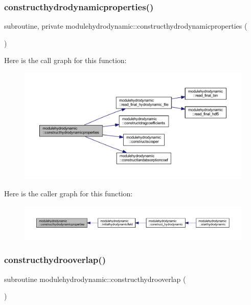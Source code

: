 \subsubsection{\texorpdfstring{constructhydrodynamicproperties()}{constructhydrodynamicproperties()}}
{\footnotesize\ttfamily subroutine, private modulehydrodynamic\+::constructhydrodynamicproperties (\begin{DoxyParamCaption}{ }\end{DoxyParamCaption})\hspace{0.3cm}{\ttfamily [private]}}

Here is the call graph for this function\+:\nopagebreak
\begin{figure}[H]
\begin{center}
\leavevmode
\includegraphics[width=350pt]{namespacemodulehydrodynamic_af871717e205963c29069ba0ee23cd512_cgraph}
\end{center}
\end{figure}
Here is the caller graph for this function\+:\nopagebreak
\begin{figure}[H]
\begin{center}
\leavevmode
\includegraphics[width=350pt]{namespacemodulehydrodynamic_af871717e205963c29069ba0ee23cd512_icgraph}
\end{center}
\end{figure}
\mbox{\label{namespacemodulehydrodynamic_a144fedbdcc486e7eda6dcae5d0b49d78}} 
\subsubsection{\texorpdfstring{constructhydrooverlap()}{constructhydrooverlap()}}
{\footnotesize\ttfamily subroutine modulehydrodynamic\+::constructhydrooverlap (\begin{DoxyParamCaption}{ }\end{DoxyParamCaption})\hspace{0.3cm}{\ttfamily [private]}}

